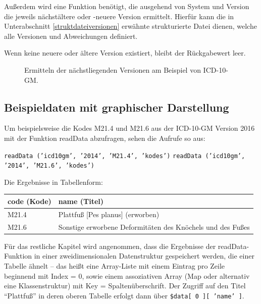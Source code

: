 Außerdem wird eine Funktion benötigt, die ausgehend von System und Version die jeweils nächstältere oder -neuere Version ermittelt. Hierfür kann die in Unterabschnitt \ref{struktdateiversionen} erwähnte strukturierte Datei dienen, welche alle Versionen und Abweichungen definiert.

Wenn keine neuere oder ältere Version existiert, bleibt der Rückgabewert leer.


\begin{figure}[H]
    \centering\large%
    \resizebox{.99\linewidth}{!}{}
    \normalsize\vspace{-1em}\caption{Ermitteln der nächstliegenden Versionen am Beispiel von ICD-10-GM.}
\end{figure}

\subsection{Beispieldaten mit graphischer Darstellung}

Um beispielsweise die Kodes M21.4 und M21.6 aus der ICD-10-GM Version 2016 mit der Funktion readData abzufragen, sehen die Aufrufe so aus:

\texttt{readData ('icd10gm', '2014', 'M21.4', 'kodes')} \newline
\texttt{readData ('icd10gm', '2014', 'M21.6', 'kodes')}

\newpage

Die Ergebnisse in Tabellenform:

\begin{centernss}
\renewcommand{\arraystretch}{1.2}
\setlength{\tabcolsep}{12pt}
\begin{tabular}{ll}
code (Kode) & name (Titel) \\
\hline
M21.4 & Plattfuß [Pes planus] (erworben) \\
M21.6 & Sonstige erworbene Deformitäten des Knöchels und des Fußes \\
\end{tabular}
\end{centernss}


Für das restliche Kapitel wird angenommen, dass die Ergebnisse der readData-Funktion in einer zweidimensionalen Datenstruktur gespeichert werden, die einer Tabelle ähnelt -- das heißt eine Array-Liste mit einem Eintrag pro Zeile beginnend mit Index = 0, sowie einem assoziativen Array (Map oder alternativ eine Klassenstruktur) mit Key = Spaltenüberschrift. Der Zugriff auf den Titel "`Plattfuß"' in deren oberen Tabelle erfolgt dann über \texttt{\$data[ 0 ][ 'name' ]}.

